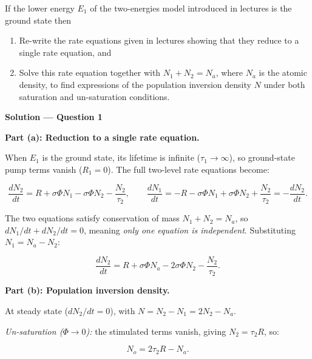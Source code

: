 
\begin{question}[Question 1]If the lower energy $E_{1}$ of the two-energies model introduced in
lectures is the ground state then
\begin{enumerate}[label=(\alph*)]
  \item Re-write the rate equations given in lectures showing that they reduce to a single rate
        equation, and
  \item Solve this rate equation together with $N_{1}+N_{2}=N_{a}$, where $N_{a}$ is the
        atomic density, to find expressions of the population inversion density $N$ under both
        saturation and un-saturation conditions.
\end{enumerate}
\end{question}

\textbf{\large Solution --- Question 1}

\textbf{Part (a): Reduction to a single rate equation.}

When $E_1$ is the ground state, its lifetime is infinite ($\tau_1\to\infty$), so ground-state pump terms vanish ($R_1=0$). The full two-level rate equations become:

\begin{equation*}
  \frac{dN_2}{dt} = R + \sigma\Phi N_1 - \sigma\Phi N_2 - \frac{N_2}{\tau_2}, \qquad
  \frac{dN_1}{dt} = -R - \sigma\Phi N_1 + \sigma\Phi N_2 + \frac{N_2}{\tau_2} = -\frac{dN_2}{dt}.
\end{equation*}

The two equations satisfy conservation of mass $N_1+N_2=N_a$, so $dN_1/dt+dN_2/dt=0$, meaning \emph{only one equation is independent}. Substituting $N_1 = N_a - N_2$:

\begin{equation*}
  \boxed{\frac{dN_2}{dt} = R + \sigma\Phi N_a - 2\sigma\Phi N_2 - \frac{N_2}{\tau_2}.}
\end{equation*}

\textbf{Part (b): Population inversion density.}

At steady state ($dN_2/dt = 0$), with $N = N_2 - N_1 = 2N_2 - N_a$.

\emph{Un-saturation ($\Phi\to 0$):} the stimulated terms vanish, giving $N_2 = \tau_2 R$, so:

\begin{equation*}
  \boxed{N_o = 2\tau_2 R - N_a.}
\end{equation*}

